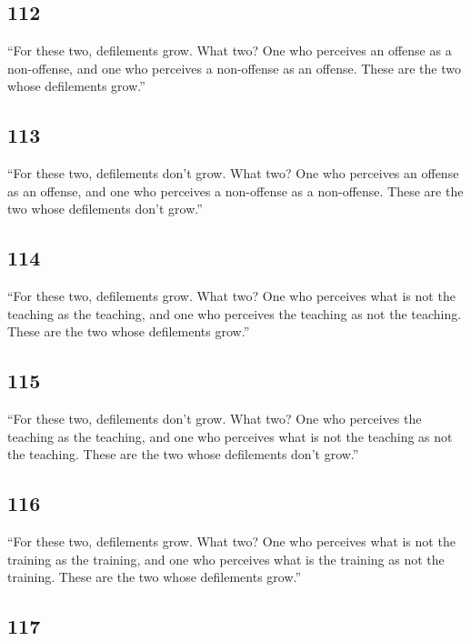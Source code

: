 \documentclass[12pt,openany]{book}%
\begin{document}
\subsection*{112 }

“For these two, defilements grow. What two? One who perceives an offense as a non-offense, and one who perceives a non-offense as an offense. These are the two whose defilements grow.” 

\subsection*{113 }

“For these two, defilements don’t grow. What two? One who perceives an offense as an offense, and one who perceives a non-offense as a non-offense. These are the two whose defilements don’t grow.” 

\subsection*{114 }

“For these two, defilements grow. What two? One who perceives what is not the teaching as the teaching, and one who perceives the teaching as not the teaching. These are the two whose defilements grow.” 

\subsection*{115 }

“For these two, defilements don’t grow. What two? One who perceives the teaching as the teaching, and one who perceives what is not the teaching as not the teaching. These are the two whose defilements don’t grow.” 

\subsection*{116 }

“For these two, defilements grow. What two? One who perceives what is not the training as the training, and one who perceives what is the training as not the training. These are the two whose defilements grow.” 

\subsection*{117 }
\end{document}
